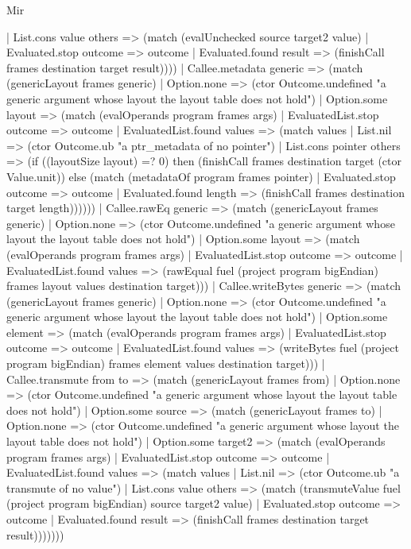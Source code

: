 \begin{lexlean}{Mir}
\begin{semanticmodule}
{        | List.cons value others => (match (evalUnchecked source target2 value)
          | Evaluated.stop outcome => outcome
          | Evaluated.found result => (finishCall frames destination target result))))
    | Callee.metadata generic => (match (genericLayout frames generic)
      | Option.none => (ctor Outcome.undefined "a generic argument whose layout the layout table does not hold")
      | Option.some layout => (match (evalOperands program frames args)
        | EvaluatedList.stop outcome => outcome
        | EvaluatedList.found values => (match values
          | List.nil => (ctor Outcome.ub "a ptr_metadata of no pointer")
          | List.cons pointer others => (if ((layoutSize layout) =? 0) then (finishCall frames destination target (ctor Value.unit)) else (match (metadataOf program frames pointer)
            | Evaluated.stop outcome => outcome
            | Evaluated.found length => (finishCall frames destination target length))))))
    | Callee.rawEq generic => (match (genericLayout frames generic)
      | Option.none => (ctor Outcome.undefined "a generic argument whose layout the layout table does not hold")
      | Option.some layout => (match (evalOperands program frames args)
        | EvaluatedList.stop outcome => outcome
        | EvaluatedList.found values => (rawEqual fuel (project program bigEndian) frames layout values destination target)))
    | Callee.writeBytes generic => (match (genericLayout frames generic)
      | Option.none => (ctor Outcome.undefined "a generic argument whose layout the layout table does not hold")
      | Option.some element => (match (evalOperands program frames args)
        | EvaluatedList.stop outcome => outcome
        | EvaluatedList.found values => (writeBytes fuel (project program bigEndian) frames element values destination target)))
    | Callee.transmute from to => (match (genericLayout frames from)
      | Option.none => (ctor Outcome.undefined "a generic argument whose layout the layout table does not hold")
      | Option.some source => (match (genericLayout frames to)
        | Option.none => (ctor Outcome.undefined "a generic argument whose layout the layout table does not hold")
        | Option.some target2 => (match (evalOperands program frames args)
          | EvaluatedList.stop outcome => outcome
          | EvaluatedList.found values => (match values
            | List.nil => (ctor Outcome.ub "a transmute of no value")
            | List.cons value others => (match (transmuteValue fuel (project program bigEndian) source target2 value)
              | Evaluated.stop outcome => outcome
              | Evaluated.found result => (finishCall frames destination target result)))))))
}


\end{semanticmodule}
\end{lexlean}
